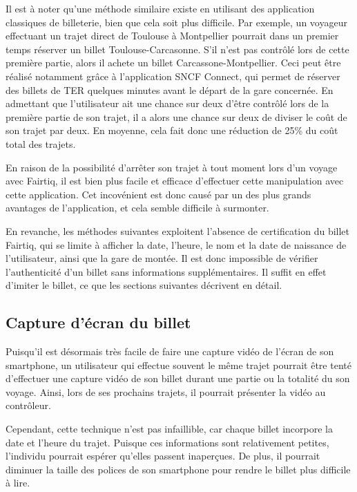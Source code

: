 \documentclass[a4paper]{article}
\begin{document}
Il est à noter qu'une méthode similaire existe en utilisant des application classiques de billeterie, bien que cela soit plus difficile.
Par exemple, un voyageur effectuant un trajet direct de Toulouse à Montpellier pourrait dans un premier temps réserver un billet
Toulouse-Carcasonne. S'il n'est pas contrôlé lors de cette première partie, alors il achete un billet Carcassone-Montpellier.
Ceci peut être réalisé notamment grâce à l'application SNCF Connect, qui permet de réserver des billets de TER quelques minutes avant le départ
de la gare concernée. En admettant que l'utilisateur ait une chance sur deux d'être contrôlé lors de la première partie de son trajet,
il a alors une chance sur deux de diviser le coût de son trajet par deux. En moyenne, cela fait donc une réduction de 25\% du coût total des trajets.

En raison de la possibilité d'arrêter son trajet à tout moment lors d'un voyage avec Fairtiq, il est bien plus facile
et efficace d'effectuer cette manipulation avec cette application.  Cet incovénient est donc causé par un des plus grands
avantages de l'application, et cela semble difficile à surmonter.

En revanche, les méthodes suivantes exploitent l'absence de certification du billet Fairtiq,
qui se limite à afficher la date, l'heure, le nom et la date de naissance de l'utilisateur,
ainsi que la gare de montée. Il est donc impossible de vérifier l'authenticité
d'un billet sans informations supplémentaires. Il suffit en effet d'imiter le billet,
ce que les sections suivantes décrivent en détail.


\subsection{Capture d'écran du billet}
Puisqu'il est désormais très facile de faire une capture vidéo de l'écran de son smartphone,
un utilisateur qui effectue souvent le même trajet pourrait être tenté d'effectuer une
capture vidéo de son billet durant une partie ou la totalité du son voyage.
Ainsi, lors de ses prochains trajets, il pourrait présenter la vidéo au contrôleur.

Cependant, cette technique n'est pas infaillible, car chaque billet incorpore la date et l'heure du trajet.
Puisque ces informations sont relativement petites, l'individu pourrait espérer qu'elles passent inaperçues. De plus,
il pourrait diminuer la taille des polices de son smartphone pour rendre le billet plus difficile à lire.
\end{document}
